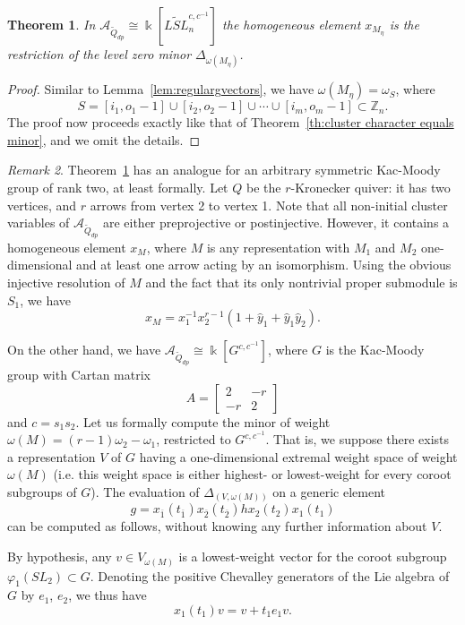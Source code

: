 \documentclass[12pt]{amsart}
\newcommand{\cA}{\mathcal{A}}
\newcommand{\ZZ}{\mathbb{Z}}
\newcommand{\kk}{\Bbbk}
\newcommand{\gv}{\omega}
\newcommand{\grep}{\gv}
\newcommand{\ol}[1]{\overline{#1}}
\newcommand{\Qdp}{\widetilde{Q}_{dp}}
\newcommand{\Qrep}{M}
\newtheorem{theorem}{Theorem}[section]
\theoremstyle{remark}
\newtheorem{remark}[theorem]{Remark}
\numberwithin{equation}{section}
\numberwithin{figure}{section}
\begin{document}
\begin{theorem}
  \label{thm:homogeneous}
  In $\cA_{\Qdp} \cong \kk[\widetilde{LSL}_n^{c,c^{-1}}]$ the homogeneous element $x_{\Qrep_\eta}$ is the restriction of the level zero minor $\Delta_{\grep(\Qrep_\eta)}$.
\end{theorem}
\begin{proof}
  Similar to Lemma~\ref{lem:regulargvectors}, we have $\grep(\Qrep_\eta) = \omega_S$, where
  \[
    S=[i_1,o_1-1] \cup [i_2,o_2-1] \cup \cdots \cup [i_m,o_m-1] \subset \ZZ_n.
  \]
  The proof now proceeds exactly like that of Theorem~\ref{th:cluster character equals minor}, and we omit the details.
\end{proof}

\begin{remark}
\label{rmk:nonaffinehomelt}
  Theorem~\ref{thm:homogeneous} has an analogue for an arbitrary symmetric Kac-Moody group of rank two, at least formally.
  Let $Q$ be the $r$-Kronecker quiver: it has two vertices, and $r$ arrows from vertex 2 to vertex 1.
  Note that all non-initial cluster variables of $\cA_{\Qdp}$ are either preprojective or postinjective.
  However, it contains a homogeneous element $x_M$, where $M$ is any representation with $M_1$ and $M_2$ one-dimensional and at least one arrow acting by an isomorphism.
  Using the obvious injective resolution of $M$ and the fact that its only nontrivial proper submodule is $S_1$, we have
  \[
    x_M = x_1^{-1}x_2^{r-1}(1 + \hat{y}_1 + \hat{y}_1 \hat{y}_2).
  \]

  On the other hand, we have $\cA_{\Qdp} \cong \kk[G^{c,c^{-1}}]$, where $G$ is the Kac-Moody group with Cartan matrix
  \[
    A = \begin{bmatrix} 2 & -r \\ -r & 2 \end{bmatrix}
  \]
  and $c = s_1 s_2$.
  Let us formally compute the minor of weight $\grep(\Qrep) = (r-1) \omega_2 - \omega_1$, restricted to $G^{c,c^{-1}}$.
  That is, we suppose there exists a representation $V$ of $G$ having a one-dimensional extremal weight space of weight $\grep(\Qrep)$ (i.e. this weight space is either highest- or lowest-weight for every coroot subgroups of $G$).
  The evaluation of $\Delta_{(V,\grep(M))}$ on a generic element
  \[
    g = x_{\ol{1}}(t_{\ol{1}}) x_{\ol{2}}(t_{\ol{2}})hx_2(t_2)x_1(t_1)
  \]
  can be computed as follows, without knowing any further information about $V$.

  By hypothesis, any $v \in V_{\grep(\Qrep)}$ is a lowest-weight vector for the coroot subgroup $\varphi_1(SL_2) \subset G$.
  Denoting the positive Chevalley generators of the Lie algebra of $G$ by $e_1$, $e_2$, we thus have
  \[
    x_1(t_1)v = v + t_1e_1v.
  \]


\end{remark}
\end{document}
